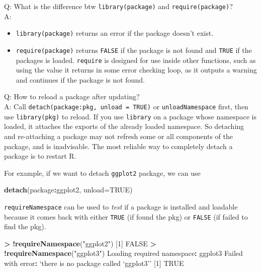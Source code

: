 \documentclass[
  a4paper,
  twoside,
  openright]{book}
\newenvironment{Shaded}{\begin{snugshade}}{\end{snugshade}}
\newcommand{\AttributeTok}[1]{\textcolor[rgb]{0.13,0.29,0.53}{#1}}
\newcommand{\ConstantTok}[1]{\textcolor[rgb]{0.56,0.35,0.01}{#1}}
\newcommand{\DecValTok}[1]{\textcolor[rgb]{0.00,0.00,0.81}{#1}}
\newcommand{\FunctionTok}[1]{\textcolor[rgb]{0.13,0.29,0.53}{\textbf{#1}}}
\newcommand{\NormalTok}[1]{#1}
\newcommand{\SpecialCharTok}[1]{\textcolor[rgb]{0.81,0.36,0.00}{\textbf{#1}}}
\newcommand{\StringTok}[1]{\textcolor[rgb]{0.31,0.60,0.02}{#1}}
\theoremstyle{definition}
\theoremstyle{definition}
\theoremstyle{definition}
\theoremstyle{definition}
\theoremstyle{remark}
\begin{document}
Q: What is the difference btw \texttt{library(package)} and \texttt{require(package)}?\\
A:

\begin{itemize}
\item
  \texttt{library(package)} returns an error if the package doesn't exist.
\item
  \texttt{require(package)} returns \texttt{FALSE} if the package is not found and \texttt{TRUE} if the packages is loaded. \texttt{require} is designed for use inside other functions, such as using the value it returns in some error checking loop, as it outputs a warning and continues if the package is not found.
\end{itemize}

Q: How to reload a package after updating?\\
A: Call \texttt{detach(package:pkg,\ unload\ =\ TRUE)} or \texttt{unloadNamespace} first, then use \texttt{library(pkg)} to reload. If you use \texttt{library} on a package whose namespace is loaded, it attaches the exports of the already loaded namespace. So detaching and re-attaching a package may not refresh some or all components of the package, and is inadvisable. The most reliable way to completely detach a package is to {restart R}.

For example, if we want to detach \texttt{ggplot2} package, we can use

\begin{Shaded}
\begin{Highlighting}[]
\FunctionTok{detach}\NormalTok{(package}\SpecialCharTok{:}\NormalTok{ggplot2, }\AttributeTok{unload=}\ConstantTok{TRUE}\NormalTok{)}
\end{Highlighting}
\end{Shaded}

\texttt{requireNamespace} can be used to \emph{test} if a package is installed and loadable because it comes back with either \texttt{TRUE} (if found the pkg) or \texttt{FALSE} (if failed to find the pkg).

\begin{Shaded}
\begin{Highlighting}[]
\SpecialCharTok{\textgreater{}} \SpecialCharTok{!}\FunctionTok{requireNamespace}\NormalTok{(}\StringTok{"ggplot2"}\NormalTok{)}
\NormalTok{[}\DecValTok{1}\NormalTok{] }\ConstantTok{FALSE}
\SpecialCharTok{\textgreater{}} \SpecialCharTok{!}\FunctionTok{requireNamespace}\NormalTok{(}\StringTok{"ggplot3"}\NormalTok{)}
\NormalTok{Loading required namespace}\SpecialCharTok{:}\NormalTok{ ggplot3}
\NormalTok{Failed with error}\SpecialCharTok{:}\NormalTok{  ‘there is no package called ‘ggplot3’’}
\NormalTok{[}\DecValTok{1}\NormalTok{] }\ConstantTok{TRUE}
\end{Highlighting}
\end{Shaded}
\end{document}
